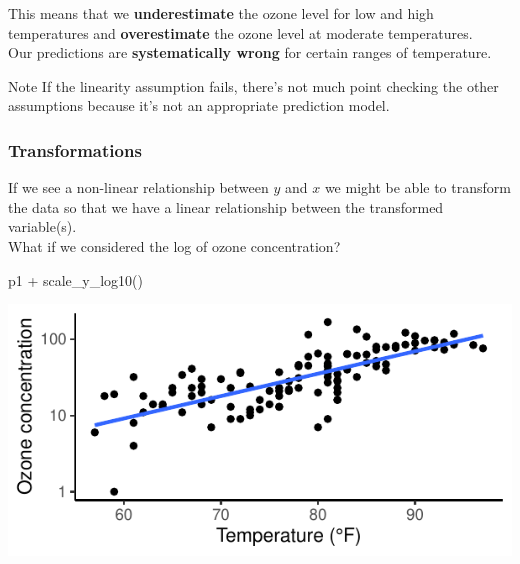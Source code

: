 \documentclass[a4paper]{article}
\begin{document}
\hspace{0.02\textwidth}
\begin{minipage}[m]{0.49\textwidth}
This means that we \textcolor{myred}{\textbf{underestimate}} the ozone level for low and high temperatures and \textcolor{myred}{\textbf{overestimate}} the ozone level at moderate temperatures.\\
Our predictions are \textcolor{myblue}{\textbf{systematically wrong}} for certain ranges of temperature.
\begin{bluebox}{Note}
	If the linearity assumption fails, there's not much point checking the other assumptions because it's not an appropriate prediction model.
\end{bluebox}
\end{minipage}
\subsubsection{Transformations}
If we see a non-linear relationship between \( y \) and \( x \) we might be able to transform the data so that we have a linear relationship between the transformed variable(s).\\
What if we considered the log of ozone concentration?
\begin{Schunk}
\begin{Sinput}
p1 + scale_y_log10()
\end{Sinput}


{\centering \includegraphics[width=\maxwidth]{figure/listings-unnamed-chunk-346-1} 

}

\end{Schunk}
\end{document}
